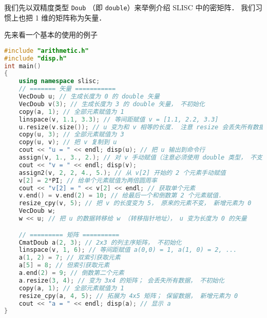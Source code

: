 
\begin{issues}
\issueDraft
\end{issues}


我们先以双精度类型 \verb|Doub| （即 \verb|double|）来举例介绍 SLISC 中的密矩阵． 我们习惯上也把 1 维的矩阵称为矢量．

先来看一个基本的使用的例子
\begin{lstlisting}[language=cpp]
#include "arithmetic.h"
#include "disp.h"
int main()
{
    using namespace slisc;
    // ======= 矢量 ===========
    VecDoub u; // 生成长度为 0 的 double 矢量
    VecDoub v(3); // 生成长度为 3 的 double 矢量， 不初始化
    copy(a, 1); // 全部元素赋值为 1
    linspace(v, 1.1, 3.3); // 等间距赋值 v = [1.1, 2.2, 3.3]
    u.resize(v.size()); // u 变为和 v 相等的长度． 注意 resize 会丢失所有数据
    copy(u, 3); // 全部元素赋值为 3
    copy(u, v); // 把 v 复制到 u
    cout << "u = " << endl; disp(u); // 把 u 输出到命令行
    assign(v, 1., 3., 2.); // 对 v 手动赋值（注意必须使用 double 类型， 不支持自动转换）
    cout << "v = " << endl; disp(v);
    assign2(v, 2, 2, 4., 5.); // 从 v[2] 开始的 2 个元素手动赋值
    v[2] = 2*PI; // 给单个元素赋值为两倍圆周率
    cout << "v[2] = " << v[2] << endl; // 获取单个元素
    v.end() = v.end(2) = 10; // 给最后一个和倒数第 2 个元素赋值．
    resize_cpy(v, 5); // 把 v 的长度变为 5， 原来的元素不变， 新增元素为 0
    VecDoub w;
    w << u; // 把 u 的数据转移给 w （转移指针地址）， u 变为长度为 0 的矢量

    // ========= 矩阵 ==========
    CmatDoub a(2, 3); // 2x3 的列主序矩阵， 不初始化
    linspace(v, 1, 6); // 等间距赋值 a(0,0) = 1, a(1, 0) = 2, ...
    a(1, 2) = 7; // 双索引获取元素
    a[5] = 8; // 但索引获取元素
    a.end(2) = 9; // 倒数第二个元素
    a.resize(3, 4); // 变为 3x4 的矩阵； 会丢失所有数据， 不初始化
    copy(a, 1); // 全部元素赋值为 1
    resize_cpy(a, 4, 5); // 拓展为 4x5 矩阵； 保留数据， 新增元素为 0
    cout << "a = " << endl; disp(a); // 显示 a
}
\end{lstlisting}

